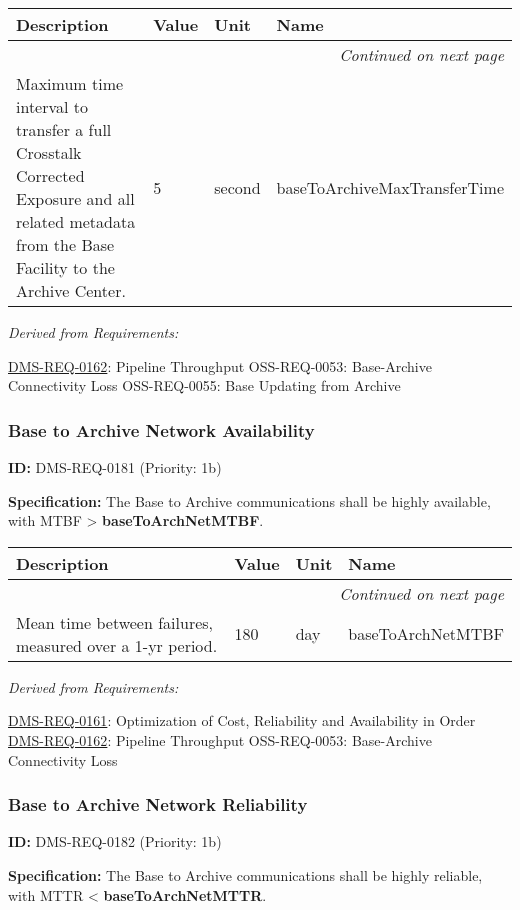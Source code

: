 \documentclass[SE,toc,lsstdraft]{lsstdoc}
\makeatletter
\newcommand{\paramname}[1]{\hspace{0pt}#1}
\newcommand{\unitname}[1]{\hspace{0pt}#1}
\newenvironment{parameters}[0]{%
\setlength\LTleft{0pt}
\setlength\LTright{\fill}
\begin{small}
\begin{longtable}[]{|p{0.49\textwidth}|l|p{0.6in}|p{1.70in}@{}|}

\hline \textbf{Description} & \textbf{Value} & \textbf{Unit} & \textbf{Name} \\ \hline
\endhead

\hline \multicolumn{4}{r}{\emph{Continued on next page}} \\
\endfoot

\hline\hline
\endlastfoot
}{%
\hline
\end{longtable}
\end{small}
}
\makeatother
\begin{document}
\begin{parameters}
Maximum time interval to transfer a full Crosstalk Corrected Exposure and all related metadata from the Base Facility to the Archive Center.
&
5
&
\unitname{%
second
}
&
\paramname{%
baseToArchiveMaxTransferTime
} \\\hline
\end{parameters}

\emph{Derived from Requirements:}

\hyperref[DMS-REQ-0162]{DMS-REQ-0162}:
Pipeline Throughput \newline
OSS-REQ-0053:
Base-Archive Connectivity Loss \newline
OSS-REQ-0055:
Base Updating from Archive \newline

\subsubsection{Base to Archive Network Availability}

\label{DMS-REQ-0181}
\textbf{ID:} DMS-REQ-0181 (Priority: 1b)

\textbf{Specification: }The Base to Archive communications shall be highly available, with MTBF >  \textbf{baseToArchNetMTBF}.

\begin{parameters}
Mean time between failures, measured over a 1-yr period.
&
180
&
\unitname{%
day
}
&
\paramname{%
baseToArchNetMTBF
} \\\hline
\end{parameters}

\emph{Derived from Requirements:}

\hyperref[DMS-REQ-0161]{DMS-REQ-0161}:
Optimization of Cost, Reliability and Availability in Order \newline
\hyperref[DMS-REQ-0162]{DMS-REQ-0162}:
Pipeline Throughput \newline
OSS-REQ-0053:
Base-Archive Connectivity Loss \newline

\subsubsection{Base to Archive Network Reliability}

\label{DMS-REQ-0182}
\textbf{ID:} DMS-REQ-0182 (Priority: 1b)

\textbf{Specification:} The Base to Archive communications shall be highly reliable, with MTTR <  \textbf{baseToArchNetMTTR}.
\end{document}
